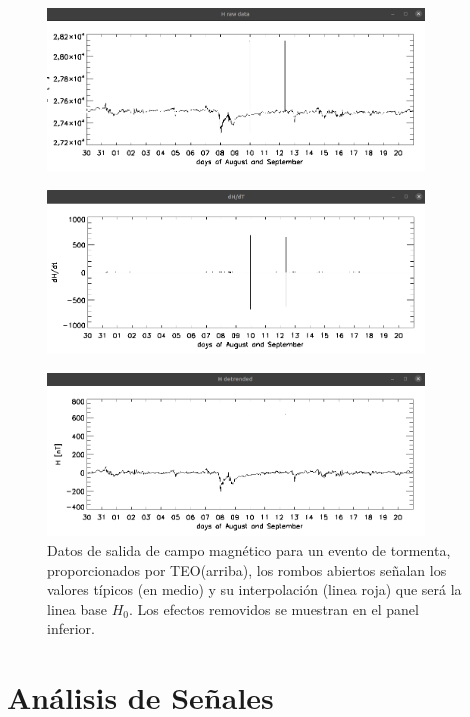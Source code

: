 \begin{figure}[h!]
    \centering
    \centerline{\Large \bf   
         \hfill}
          \centerline{\Large \bf   
         \hfill}
     \includegraphics[width=10.0cm]{Images/cap2/lineabase/picos/picos.png}
     \centerline{\Large \bf   
         \hfill}
     \includegraphics[width=10.0cm]{Images/cap2/lineabase/picos/picos2.png}     
     \centerline{\Large \bf   
         \hfill}
      \includegraphics[width=10.0cm]{Images/cap2/lineabase/picos/picos3.png}         
       \caption{Datos de salida de campo magnético para un evento de tormenta, proporcionados por TEO(arriba), los rombos abiertos señalan los valores típicos (en medio) y su interpolación (linea roja) que será la linea base $H_0$. Los efectos removidos se muestran en el panel inferior.}
    \label{fig:picos}
\end{figure}

\section{Análisis de Señales}


